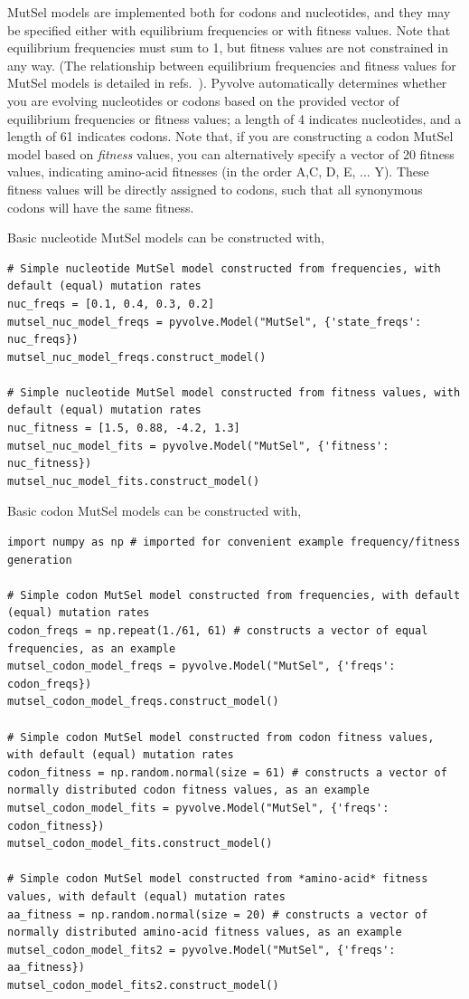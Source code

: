 \documentclass{article}
\begin{document}
MutSel models are implemented both for codons and nucleotides, and they may be specified either with equilibrium frequencies or with fitness values. Note that equilibrium frequencies must sum to 1, but fitness values are not constrained in any way. (The relationship between equilibrium frequencies and fitness values for MutSel models is detailed in refs.\ \citep{HB98,SpielmanWilke2015}). Pyvolve automatically determines whether you are evolving nucleotides or codons based on the provided vector of equilibrium frequencies or fitness values; a length of 4 indicates nucleotides, and a length of 61 indicates codons. Note that, if you are constructing a codon MutSel model based on \emph{fitness} values, you can alternatively specify a vector of 20 fitness values, indicating amino-acid fitnesses (in the order A,C, D, E, ... Y). These fitness values will be directly assigned to codons, such that all synonymous codons will have the same fitness.


Basic nucleotide MutSel models can be constructed with,
\begin{lstlisting}
# Simple nucleotide MutSel model constructed from frequencies, with default (equal) mutation rates
nuc_freqs = [0.1, 0.4, 0.3, 0.2]
mutsel_nuc_model_freqs = pyvolve.Model("MutSel", {'state_freqs': nuc_freqs})
mutsel_nuc_model_freqs.construct_model()

# Simple nucleotide MutSel model constructed from fitness values, with default (equal) mutation rates
nuc_fitness = [1.5, 0.88, -4.2, 1.3]
mutsel_nuc_model_fits = pyvolve.Model("MutSel", {'fitness': nuc_fitness})
mutsel_nuc_model_fits.construct_model()
\end{lstlisting}

Basic codon MutSel models can be constructed with,
\begin{lstlisting}
import numpy as np # imported for convenient example frequency/fitness generation

# Simple codon MutSel model constructed from frequencies, with default (equal) mutation rates
codon_freqs = np.repeat(1./61, 61) # constructs a vector of equal frequencies, as an example
mutsel_codon_model_freqs = pyvolve.Model("MutSel", {'freqs': codon_freqs})
mutsel_codon_model_freqs.construct_model()

# Simple codon MutSel model constructed from codon fitness values, with default (equal) mutation rates
codon_fitness = np.random.normal(size = 61) # constructs a vector of normally distributed codon fitness values, as an example
mutsel_codon_model_fits = pyvolve.Model("MutSel", {'freqs': codon_fitness})
mutsel_codon_model_fits.construct_model()

# Simple codon MutSel model constructed from *amino-acid* fitness values, with default (equal) mutation rates
aa_fitness = np.random.normal(size = 20) # constructs a vector of normally distributed amino-acid fitness values, as an example
mutsel_codon_model_fits2 = pyvolve.Model("MutSel", {'freqs': aa_fitness})
mutsel_codon_model_fits2.construct_model()

\end{lstlisting}
\end{document}
